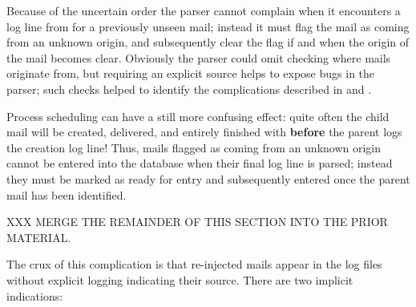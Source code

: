 Because of the uncertain order the parser cannot complain when it
encounters a log line from  for a previously unseen mail;
instead it must flag the mail as coming from an unknown origin, and
subsequently clear the flag if and when the origin of the mail becomes
clear.  Obviously the parser could omit checking where mails originate
from, but requiring an explicit source helps to expose bugs in the parser;
such checks helped to identify the complications described in
 and .

Process scheduling can have a still more confusing effect: quite often the
child mail will be created, delivered, and entirely finished with
\textbf{before} the parent logs the creation log line!  Thus, mails flagged
as coming from an unknown origin cannot be entered into the database when
their final log line is parsed; instead they must be marked as ready for
entry and subsequently entered once the parent mail has been identified.

XXX MERGE THE REMAINDER OF THIS SECTION INTO THE PRIOR MATERIAL\@.

The crux of this complication is that re-injected mails appear in the log
files without explicit logging indicating their source.  There are two
implicit indications:

